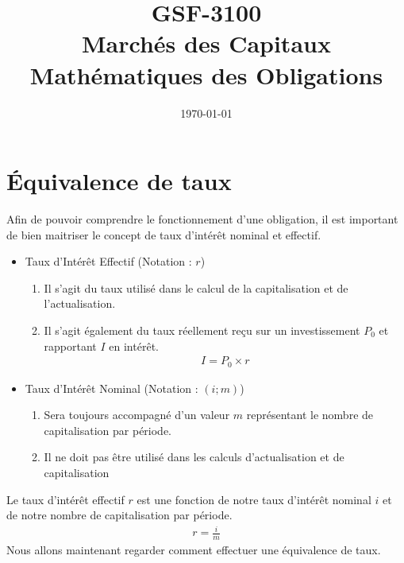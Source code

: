 \documentclass[12pt]{article}
\begin{document}
\begin{titlepage}
\title{GSF-3100 \\ Marchés des Capitaux \\ Mathématiques des Obligations}
\date{\today}
\maketitle

\setcounter{page}{0}
\thispagestyle{empty}
\end{titlepage}
\pagebreak \newpage

\tableofcontents
\pagebreak \newpage

\section{Équivalence de taux}
Afin de pouvoir comprendre le fonctionnement d'une obligation, il est important de bien maitriser le concept de taux d'intérêt nominal et effectif.

\begin{itemize}
\item Taux d'Intérêt Effectif (Notation : $r$)
\begin{enumerate}
\item Il s'agit du taux utilisé dans le calcul de la capitalisation et de l'actualisation. 
\item Il s'agit également du taux réellement reçu sur un investissement $P_0$ et rapportant $I$ en intérêt.
\begin{align*}
I=P_0 \times r
\end{align*}
\end{enumerate}
\item Taux d'Intérêt Nominal (Notation : $(i;m)$)
\begin{enumerate}
\item Sera toujours accompagné d'un valeur $m$ représentant le nombre de capitalisation par période.
\item Il ne doit pas être utilisé dans les calculs d’actualisation et de capitalisation
\end{enumerate}
\end{itemize}

Le taux d'intérêt effectif $r$ est une fonction de notre taux d'intérêt nominal $i$ et de notre nombre de capitalisation par période. 
\begin{align*}
r=\frac{i}{m}
\end{align*}
Nous allons maintenant regarder comment effectuer une équivalence de taux. 
\end{document}
